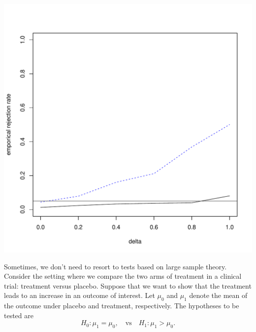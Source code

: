 \begin{knitrout}
\begin{kframe}
\begin{alltt}
\hlstd{(delta, rejrate[}\hlstd{, ],}  \hlstd{=} \hlstd{,}  \hlstd{=} \hlstd{,}  \hlstd{=} \hlstd{(}\hlstd{,} \hlstd{))}
\hlstd{(delta, rejrate[}\hlstd{, ],}  \hlstd{=} \hlstd{,}  \hlstd{=} \hlstd{)}
\hlstd{(}\hlstd{,} \hlstd{)}
\end{alltt}
\end{kframe}
\includegraphics[width=\maxwidth]{figure/hypo-twosample-power-2} 
\end{knitrout}

Sometimes, we don't need to resort to tests based on large sample
theory. Consider the setting where we compare the two arms of
treatment in a clinical trial: treatment versus placebo. Suppose that
we want to show that the treatment leads to an increase in an outcome
of interest. Let $\mu_0$ and $\mu_1$ denote the mean of the outcome
under placebo and treatment, respectively. The hypotheses to be tested
are
\[
  H_0: \mu_1 = \mu_0,
  \quad \mbox{vs} \quad
  H_1: \mu_1 > \mu_0.
\]


